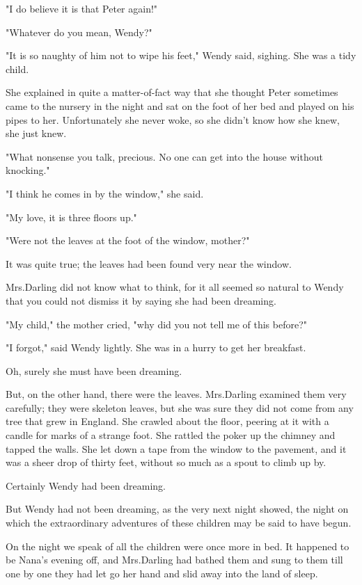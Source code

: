"I do believe it is that Peter again!"

"Whatever do you mean, Wendy?"

"It is so naughty of him not to wipe his feet," Wendy said, sighing.
She was a tidy child.

She explained in quite a matter-of-fact way that she thought Peter sometimes came to the nursery in the night and sat on the foot of her bed and played on his pipes to her.
Unfortunately she never woke, so she didn't know how she knew, she just knew.

"What nonsense you talk, precious.
No one can get into the house without knocking."

"I think he comes in by the window," she said.

"My love, it is three floors up."

"Were not the leaves at the foot of the window, mother?"

It was quite true;
the leaves had been found very near the window.

Mrs.\@ Darling did not know what to think, for it all seemed so natural to Wendy that you could not dismiss it by saying she had been dreaming.

"My child," the mother cried, "why did you not tell me of this before?"

"I forgot," said Wendy lightly.
She was in a hurry to get her breakfast.

Oh, surely she must have been dreaming.

But, on the other hand, there were the leaves.
Mrs.\@ Darling examined them very carefully;
they were skeleton leaves, but she was sure they did not come from any tree that grew in England.
She crawled about the floor, peering at it with a candle for marks of a strange foot.
She rattled the poker up the chimney and tapped the walls.
She let down a tape from the window to the pavement, and it was a sheer drop of thirty feet, without so much as a spout to climb up by.

Certainly Wendy had been dreaming.

But Wendy had not been dreaming, as the very next night showed, the night on which the extraordinary adventures of these children may be said to have begun.

On the night we speak of all the children were once more in bed.
It happened to be Nana's evening off, and Mrs.\@ Darling had bathed them and sung to them till one by one they had let go her hand and slid away into the land of sleep.

